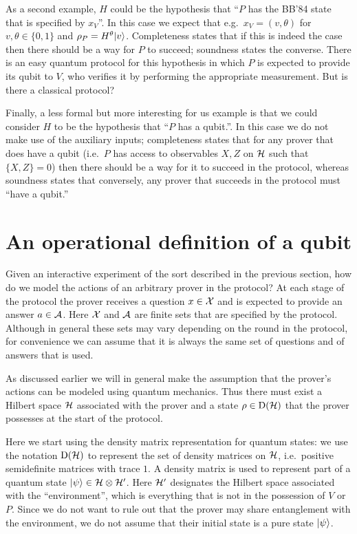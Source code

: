As a second example, $H$ could be the hypothesis that ``$P$ has the BB'84 state that is specified by $x_V$''. In this case we expect that e.g.\ $x_V = (v,\theta)$ for $v,\theta\in \{0,1\}$ and $\rho_P = H^\theta |v\rangle$. Completeness states that if this is indeed the case then there should be a way for $P$ to succeed; soundness states the converse. There is an easy quantum protocol for this hypothesis in which $P$ is expected to provide its qubit to $V$, who verifies it by performing the appropriate measurement. But is there a classical protocol?  

Finally, a less formal but more interesting for us example is that we could consider $H$ to be the hypothesis that ``$P$ has a qubit.''. In this case we do not make use of the auxiliary inputs; completeness states that for any prover that does have a qubit (i.e.\ $P$ has access to observables $X,Z$ on $\mathcal{H}$ such that $\{X,Z\}=0$) then there should be a way for it to succeed in the protocol, whereas soundness states that conversely, any prover that succeeds in the protocol must ``have a qubit.''

\section{An operational definition of a qubit} 

Given an interactive experiment of the sort described in the previous section, how do we model the actions of an arbitrary prover in the protocol? At each stage of the protocol the prover receives a question $x\in \mathcal{X}$ and is expected to provide an answer $a\in\mathcal{A}$. Here $\mathcal{X}$ and $\mathcal{A}$ are finite sets that are specified by the protocol. Although in general these sets may vary depending on the round in the protocol, for convenience we can assume that it is always the same set of questions and of answers that is used. 

As discussed earlier we will in general make the assumption that the prover's actions can be modeled using quantum mechanics. Thus there must exist a Hilbert space $\mathcal{H}$  associated with the prover and a state $\rho \in \mathrm{D}(\mathcal{H})$ that the prover possesses at the start of the protocol. 

\begin{remark} Here we start using the density matrix representation for quantum states: we use the notation $\mathrm{D}(\mathcal{H})$ to represent the set of density matrices on $\mathcal{H}$, i.e.\ positive semidefinite matrices with trace $1$. A density matrix is used to represent part of a quantum state $|\psi\rangle \in \mathcal{H} \otimes \mathcal{H}'$. Here $\mathcal{H}'$ designates the Hilbert space associated with the ``environment'', which is everything that is not in the possession of $V$ or $P$. Since we do not want to rule out that the prover may share entanglement with the environment, we do not assume that their initial state is a pure state $|\psi\rangle$.  
\end{remark}


